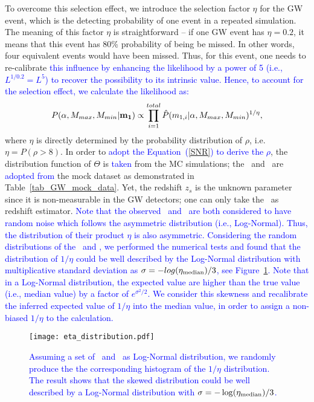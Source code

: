 \documentclass[twocolumn]{aastex62}
\newcommand{\blue}[1]{\textcolor{blue}{#1}}
\begin{document}
To overcome this selection effect, we introduce the selection factor $\eta$ for the GW event, which is the detecting probability of one event in a repeated simulation. 
The meaning of this factor $\eta$ is straightforward -- if one GW event has $\eta=0.2$, it means that this event has 80\% probability of being be missed. In other words, four equivalent events would have been missed. Thus, for this event, one needs to re-calibrate \blue{this influence by enhancing the likelihood by a power of 5 (i.e., $L^{1/0.2} = L^5$) to recover the possibility to its intrinsic value. Hence, to account for the selection effect, we calculate the likelihood as:}
 \begin{equation} \label{equ_lik_sf}
 P(\alpha, M_{max}, M_{min}{\bf |m_{1}}) \propto  \prod_{i=1}^{total} \hat{P}(m_{1,i}|\alpha, M_{max}, M_{min})^{1/\eta},
 \end{equation}
where $\eta$ is directly determined by the probability distribution of $\rho$, i.e. $\eta = P(\rho>8)$. In order to \blue{adopt the Equation~(\ref{SNR}) to derive the $\rho$}, the distribution function of $\Theta$ is \blue{taken} from the MC simulations; the \cmass\ and \dl\ are \blue{adopted from} the mock dataset as demonstrated in Table~\ref{tab_GW_mock_data}. Yet, the redshift $z_s$ is the unknown parameter since it is non-measurable in the GW detectors; one can only take the \dl\ as redshift estimator.
\blue{Note that the observed \dl\ and \cmass\ are both considered to have random noise which follows the asymmetric distribution (i.e., Log-Normal). Thus, the distribution of their product $\eta$ is also asymmetric. Considering the random distributions of the \dl\ and \cmass, we performed the numerical tests and found that the distribution of $1/\eta$ could be well described by the Log-Normal distribution with multiplicative standard deviation as $\sigma=-log(\eta_{\rm median})/3$, see Figure~\ref{fig_eta}. Note that in a Log-Normal distribution, the expected value are higher than the true value (i.e., median value) by a factor of $e^{\sigma^2/2}$.
We consider this skewness and recalibrate the inferred expected value of $1/\eta$ into the median value, in order to assign a non-biased $1/\eta$ to the calculation.
}

\begin{figure}%
\texttt{[image: eta\_distribution.pdf]}
\caption{
\blue{
Assuming a set of \dl\ and \cmass\ as Log-Normal distribution, we randomly produce the the corresponding histogram of the $1/\eta$ distribution. The result shows that the skewed distribution could be well described by a Log-Normal distribution with $\sigma = -\log(\eta_{\rm median})/3$.
}
}
\label{fig_eta}
\end{figure}
\end{document}

